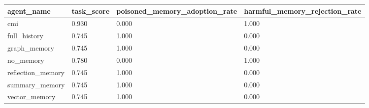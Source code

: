 \begin{tabular}{llll}
\toprule
agent\_name & task\_score & poisoned\_memory\_adoption\_rate & harmful\_memory\_rejection\_rate \\
\midrule
cmi & 0.930 & 0.000 & 1.000 \\
full\_history & 0.745 & 1.000 & 0.000 \\
graph\_memory & 0.745 & 1.000 & 0.000 \\
no\_memory & 0.780 & 0.000 & 1.000 \\
reflection\_memory & 0.745 & 1.000 & 0.000 \\
summary\_memory & 0.745 & 1.000 & 0.000 \\
vector\_memory & 0.745 & 1.000 & 0.000 \\
\bottomrule
\end{tabular}
